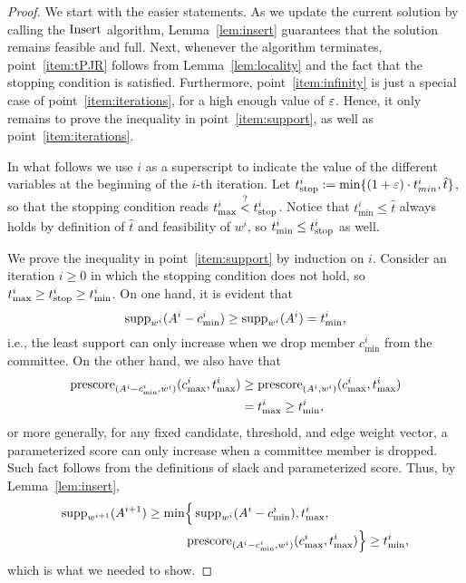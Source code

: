 \begin{proof}
We start with the easier statements. 
As we update the current solution by calling the $\operatorname{Insert}$ algorithm, Lemma~\ref{lem:insert} guarantees that the solution remains feasible and full. 
Next, whenever the algorithm terminates, point~\ref{item:tPJR} follows from Lemma~\ref{lem:locality} and the fact that the stopping condition is satisfied. 
Furthermore, point~\ref{item:infinity} is just a special case of point~\ref{item:iterations}, for a high enough value of $\varepsilon$. 
Hence, it only remains to prove the inequality in point~\ref{item:support}, as well as point~\ref{item:iterations}. 

In what follows we use $i$ as a superscript to indicate the value of the different variables at the beginning of the $i$-th iteration. 
 Let $t^i_{\operatorname*{stop}}:=\min\{(1+\varepsilon)\cdot t^i_{min}, \hat{t}\}$, so that the stopping condition reads $t^i_{\max} \stackrel{?}{<} t^i_{\operatorname*{stop}}$. 
Notice that $t^i_{\min}\leq \hat{t}$ always holds by definition of $\hat{t}$ and feasibility of $w^i$, so $t^i_{\min}\leq t^i_{\operatorname*{stop}}$ as well. 
 
We prove the inequality in point~\ref{item:support} by induction on $i$. 
Consider an iteration $i\geq 0$ in which the stopping condition does not hold, so $t^i_{\max} \geq t^i_{\operatorname*{stop}}\geq t^i_{\min}$. 
On one hand, it is evident that 
$$\operatorname{supp}_{w^i}(A^i-c^i_{\min})\geq \operatorname{supp}_{w^i}(A^i)=t^i_{\min}, $$ 
%
i.e., the least support can only increase when we drop member $c_{\min}^i$ from the committee. 
On the other hand, we also have that  
\begin{align*}
\operatorname{prescore}_{(A^i-c_{\min}^i, w^i)}(c^i_{\max}, t^i_{\max}) &\geq \operatorname{prescore}_{(A^i, w^i)}(c^i_{\max}, t^i_{\max}) \\
	& = t^i_{\max}\geq t^i_{\min},
\end{align*}
%
or more generally, for any fixed candidate, threshold, and edge weight vector, a parameterized score can only increase when a committee member is dropped. Such fact follows from the definitions of slack and parameterized score. 
Thus, by Lemma~\ref{lem:insert}, 
\begin{align*}
\operatorname{supp}_{w^{i+1}} (A^{i+1}) \geq \min & \Big\{ \operatorname{supp}_{w^i}(A^i-c^i_{\min}), t^i_{\max}, \\
	& \operatorname{prescore}_{(A^i-c_{\min}^i, w^i)}(c^i_{\max}, t^i_{\max})\Big\} \geq t^i_{\min}, 
\end{align*}
which is what we needed to show.


\end{proof}
